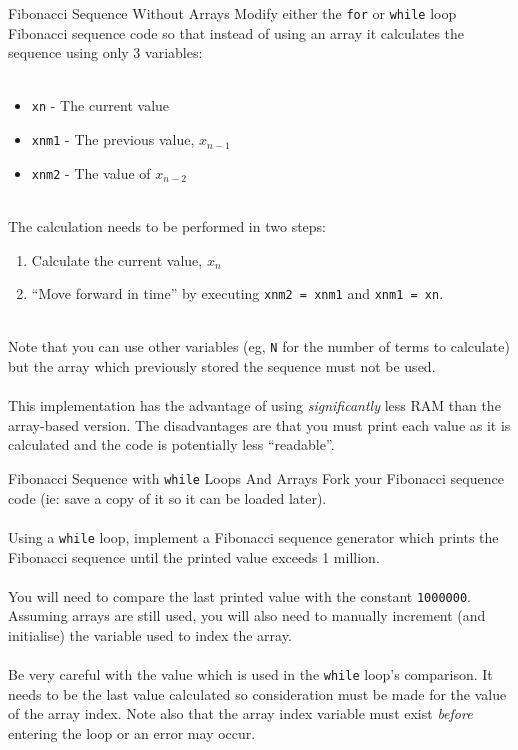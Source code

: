 \documentclass{lab}
\begin{document}
\begin{task}{Fibonacci Sequence Without Arrays}{}\label{task:noArray}
Modify either the \texttt{for} or \texttt{while} loop Fibonacci sequence code so that instead of using an array it calculates the sequence using only 3 variables:
\\~
\begin{itemize}
\item \texttt{xn} - The current value
\item \texttt{xnm1} - The previous value, $x_{n-1}$
\item \texttt{xnm2} - The value of $x_{n-2}$
\end{itemize}
~\\
The calculation needs to be performed in two steps:
\\
\begin{enumerate}
\item Calculate the current value, $x_n$
\item ``Move forward in time'' by executing \texttt{xnm2 = xnm1} and \texttt{xnm1 = xn}.
\end{enumerate}
~\\
Note that you can use other variables (eg, \texttt{N} for the number of terms to calculate) but the array which previously stored the sequence must not be used.
\\~\\
This implementation has the advantage of using \textit{significantly} less RAM than the array-based version. The disadvantages are that you must print each value as it is calculated and the code is potentially less ``readable''.
\end{task}

\begin{task}{Fibonacci Sequence with \texttt{while} Loops And Arrays}{}\label{task:fibWhileArray}
Fork your Fibonacci sequence code (ie: save a copy of it so it can be loaded later).
\\~\\
Using a \texttt{while} loop, implement a Fibonacci sequence generator which prints the Fibonacci sequence until the printed value exceeds 1 million.
\\~\\
You will need to compare the last printed value with the constant \texttt{1000000}. Assuming arrays are still used, you will also need to manually increment (and initialise) the variable used to index the array.
\\~\\
Be very careful with the value which is used in the \texttt{while} loop's comparison. It needs to be the last value calculated so consideration must be made for the value of the array index. Note also that the array index variable must exist \textit{before} entering the loop or an error may occur.
\end{task}
\end{document}
